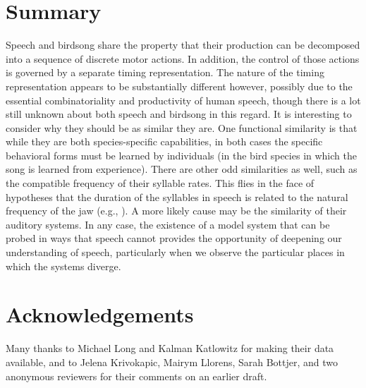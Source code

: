 \documentclass[output=paper,
modfonts
]{LSP/langsci}
\begin{document}
\section{Summary}

Speech and birdsong share the property that their production can be decomposed into a sequence of discrete motor actions. In addition, the control of those actions is governed by a  separate timing representation.  The nature of the timing representation appears to be substantially different however, possibly due to the essential combinatoriality and productivity of human speech, though there is a lot still unknown about both speech and birdsong in this regard. It is interesting to consider why they should be as similar they are. One functional similarity is that while they are both species-specific capabilities, in both cases the specific behavioral forms must be learned by individuals (in the bird species in which the song is learned from experience). There are other odd similarities as well, such as the compatible frequency of their syllable rates. This flies in the face of hypotheses that the duration of the syllables in speech is related to the natural frequency of the jaw (e.g., \citealt{Davis}). A more likely cause may be the similarity of their auditory systems. In any case, the existence of a model system that can be probed in ways that speech cannot provides the opportunity of deepening our understanding of speech, particularly when we observe the particular places in which the systems diverge.



\section*{Acknowledgements}
Many thanks to Michael Long and Kalman  Katlowitz for making their data available, and to Jelena Krivokapic, Mairym Llorens, Sarah Bottjer, and two anonymous reviewers for their comments on an earlier draft.



\printbibliography[heading=subbibliography,notkeyword=this]
\end{document}
